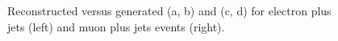  \begin{figure}[hbtp]
	\centering
	\hfill
	\\
	\hfill
	\\
	\caption{Reconstructed versus generated \WPT (a, b) and \MT (c, d) for electron plus jets (left) and muon plus jets
	events (right).}
	\label{fig:choice_of_bins_appendix_2}
 \end{figure}

